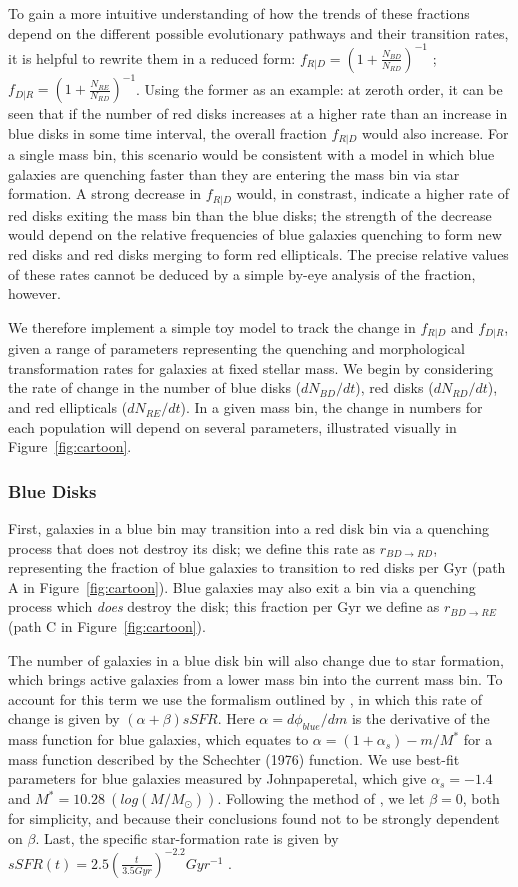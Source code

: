 To gain a more intuitive understanding of how the trends of these fractions depend on the different possible evolutionary pathways and their transition rates, it is helpful to rewrite them in a reduced form: $f_{R|D} = ({1+\frac{N_{BD}}{N_{RD}}})^{-1}$ ; $f_{D|R} = ({1+\frac{N_{RE}}{N_{RD}}})^{-1}$. Using the former as an example: at zeroth order, it can be seen that if the number of red disks increases at a higher rate than an increase in blue disks in some time interval, the overall fraction $f_{R|D}$ would also increase. For a single mass bin, this scenario would be consistent with a model in which blue galaxies are quenching faster than they are entering the mass bin via star formation. A strong decrease in $f_{R|D}$ would, in constrast, indicate a higher rate of red disks exiting the mass bin than the blue disks; the strength of the decrease would depend on the relative frequencies of blue galaxies quenching to form new red disks and red disks merging to form red ellipticals. The precise relative values of these rates cannot be deduced by a simple by-eye analysis of the fraction, however.

We therefore implement a simple toy model to track the change in $f_{R|D}$ and $f_{D|R}$, given a range of parameters representing the quenching and morphological transformation rates for galaxies at fixed stellar mass. We begin by considering the rate of change in the number of blue disks ($dN_{BD}/dt$), red disks ($dN_{RD}/dt$), and red ellipticals ($dN_{RE}/dt$). In a given mass bin, the change in numbers for each population will depend on several parameters, illustrated visually in Figure~\ref{fig:cartoon}.

\subsubsection{Blue Disks}
First, galaxies in a blue bin may transition into a red disk bin via a quenching process that does not destroy its disk; we define this rate as $r_{BD \rightarrow RD}$, representing the fraction of blue galaxies to transition to red disks per Gyr (path A in Figure~\ref{fig:cartoon}). Blue galaxies may also exit a bin via a quenching process which \emph{does} destroy the disk; this fraction per Gyr we define as $r_{BD \rightarrow RE}$ (path C in Figure~\ref{fig:cartoon}).

The number of galaxies in a blue disk bin will also change due to star formation, which brings active galaxies from a lower mass bin into the current mass bin. To account for this term we use the formalism outlined by \citet{Peng2010}, in which this rate of change is given by $(\alpha + \beta)sSFR$. Here $\alpha = d\phi_{blue}/dm$ is the derivative of the mass function for blue galaxies, which equates to $\alpha = (1+\alpha_s) - m/M^*$ for a mass function described by the Schechter (1976) function. We use best-fit parameters for blue galaxies measured by Johnpaperetal, which give $\alpha_s = -1.4$ and $M^* = 10.28 ~(log(M/M_{\odot}))$. Following the method of \citet{Peng2010}, we let $\beta=0$, both for simplicity, and because their conclusions found not to be strongly dependent on $\beta$. Last, the specific star-formation rate is given by $sSFR(t) = 2.5(\frac{t}{3.5 Gyr})^{-2.2}Gyr^{-1}$ \citep{Peng2010}.

